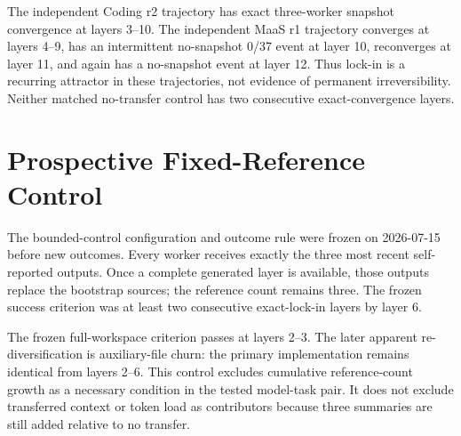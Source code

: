 \documentclass[letterpaper]{article}
\begin{document}
The independent Coding r2 trajectory has exact three-worker snapshot
convergence at layers 3--10. The independent MaaS r1 trajectory converges at
layers 4--9, has an intermittent no-snapshot 0/37 event at layer 10,
reconverges at layer 11, and again has a no-snapshot event at layer 12. Thus
lock-in is a recurring attractor in these trajectories, not evidence of
permanent irreversibility. Neither matched no-transfer control has two
consecutive exact-convergence layers.

\section{Prospective Fixed-Reference Control}

The bounded-control configuration and outcome rule were frozen on
2026-07-15 before new outcomes. Every worker receives exactly the three most
recent self-reported outputs. Once a complete generated layer is available,
those outputs replace the bootstrap sources; the reference count remains
three. The frozen success criterion was at least two consecutive exact-lock-in
layers by layer 6.

\begin{table}[t]
\centering
\caption{Complete bounded-control trajectory. ``Workspace'' hashes every file;
``primary'' hashes only \texttt{cfgpipe.py}. All workers pass 34/37 and 4/4
Core at every layer. Input ratio uses the matched same-provider no-transfer
layer.}
\label{tab:supp-bounded}
\small
{}
\end{table}

The frozen full-workspace criterion passes at layers 2--3. The later apparent
re-diversification is auxiliary-file churn: the primary implementation remains
identical from layers 2--6. This control excludes cumulative reference-count
growth as a necessary condition in the tested model-task pair. It does not
exclude transferred context or token load as contributors because three
summaries are still added relative to no transfer.
\end{document}
